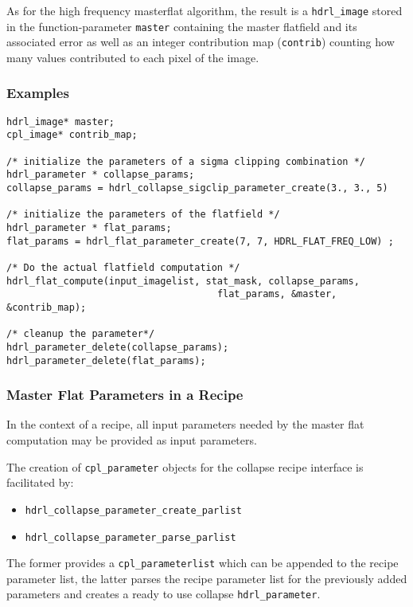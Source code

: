 As for the high frequency masterflat algorithm, the result is a
\verb+hdrl_image+ stored in the function-parameter \verb+master+
containing the master flatfield and its associated error as well as an
integer contribution map (\verb+contrib+) counting how many values
contributed to each pixel of the image.


\subsubsection{Examples}
\begin{lstlisting}
hdrl_image* master;
cpl_image* contrib_map;

/* initialize the parameters of a sigma clipping combination */
hdrl_parameter * collapse_params;
collapse_params = hdrl_collapse_sigclip_parameter_create(3., 3., 5)

/* initialize the parameters of the flatfield */
hdrl_parameter * flat_params;
flat_params = hdrl_flat_parameter_create(7, 7, HDRL_FLAT_FREQ_LOW) ;

/* Do the actual flatfield computation */
hdrl_flat_compute(input_imagelist, stat_mask, collapse_params,
                                     flat_params, &master, &contrib_map);

/* cleanup the parameter*/
hdrl_parameter_delete(collapse_params);
hdrl_parameter_delete(flat_params);
\end{lstlisting}



\subsubsection{Master Flat Parameters in a Recipe}

In the context of a recipe, all input parameters needed by the master flat
computation may be provided as input parameters.

The creation of \verb+cpl_parameter+ objects for the collapse recipe interface is
facilitated by:
\begin{itemize}
\item \verb+hdrl_collapse_parameter_create_parlist+
\item \verb+hdrl_collapse_parameter_parse_parlist+
\end{itemize}
The former provides a \verb+cpl_parameterlist+ which can be appended
to the recipe parameter list, the latter parses the recipe parameter
list for the previously added parameters and creates a ready to use
collapse \verb+hdrl_parameter+.

